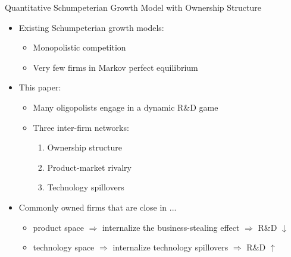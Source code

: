 \documentclass[
  10pt,
  aspectratio=169,   %
]{beamer}
\theoremstyle{plain}
\begin{document}
\begin{frame}{Quantitative Schumpeterian Growth Model with Ownership Structure}
  \begin{itemize}
    \item Existing Schumpeterian growth models:
          \begin{itemize}
            \item Monopolistic competition
            \item Very few firms in Markov perfect equilibrium
          \end{itemize}
          \medskip{}\pause
    \item This paper:
          \begin{itemize}
            \item Many oligopolists engage in a dynamic R\&D game
            \item Three inter-firm networks:
                  \begin{enumerate}
                    \item Ownership structure
                    \item Product-market rivalry
                    \item Technology spillovers
                  \end{enumerate}
          \end{itemize}
          \medskip{}\pause
    \item Commonly owned firms that are close in ...
          \begin{itemize}
            \item product space $\Longrightarrow$ internalize the business-stealing effect $\Longrightarrow$ R\&D $\downarrow$
            \item technology space $\Longrightarrow$ internalize technology spillovers $\Longrightarrow$ R\&D $\uparrow$
          \end{itemize}
  \end{itemize}
\end{frame}
\end{document}
